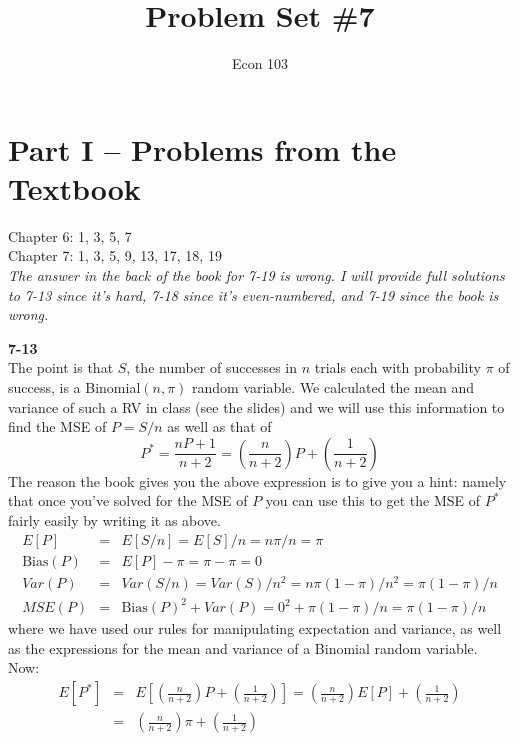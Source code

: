 \documentclass[addpoints,12pt]{exam}\usepackage[]{graphicx}\usepackage[]{color}
\title{Problem Set \#7}
\author{Econ 103}
\date{}
\begin{document}
\maketitle

\section*{Part I -- Problems from the Textbook}
Chapter 6: 1, 3, 5, 7\\
Chapter 7: 1, 3, 5, 9, 13, 17, 18, 19\\

\noindent\emph{The answer in the back of the book for 7-19 is \emph{wrong}. I will provide full solutions to 7-13 since it's hard, 7-18 since it's even-numbered, and 7-19 since the book is wrong.}


\begin{questions}
  \item[]
    \begin{solution}
    \textbf{7-13}\\
The point is that $S$, the number of successes in $n$ trials each with probability $\pi$ of success, is a Binomial$(n,\pi)$ random variable. We calculated the mean and variance of such a RV in class (see the slides) and we will use this information to find the MSE of $P = S/n$ as well as that of
  $$P^* = \frac{nP + 1}{n+2} = \left(\frac{n}{n+2}\right)P + \left(\frac{1}{n+2}\right)$$
The reason the book gives you the above expression is to give you a hint: namely that once you've solved for the MSE of $P$ you can use this to get the MSE of $P^*$ fairly easily by writing it as above.
  \begin{eqnarray*}
		E[P] &=& E[S/n] = E[S]/n = n\pi/n = \pi\\ 
		\mbox{Bias}(P) &=& E[P] - \pi = \pi - \pi = 0\\ 
		Var(P) &=& Var(S/n) = Var(S)/n^2 = n\pi(1-\pi)/n^2 = \pi(1-\pi)/n \\ 
		MSE(P) &=& \mbox{Bias}(P)^2 + Var(P) = 0^2 + \pi(1-\pi)/n = \pi(1-\pi)/n
	\end{eqnarray*}
where we have used our rules for manipulating expectation and variance, as well as the expressions for the mean and variance of a Binomial random variable. Now:
	\begin{eqnarray*}
		E[P^*] &=& E\left[ \left(\frac{n}{n+2}\right)P + \left(\frac{1}{n+2}\right)\right]=  \left(\frac{n}{n+2}\right)E[P] + \left(\frac{1}{n+2}\right)\\
			&=&  \left(\frac{n}{n+2}\right)\pi + \left(\frac{1}{n+2}\right)\\\\

\end{eqnarray*}
\end{solution}
\end{questions}
\end{document}
